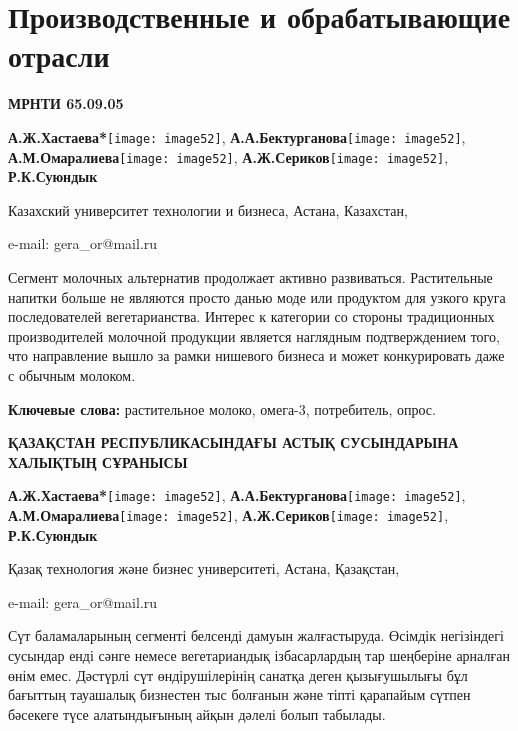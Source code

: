 \let\cleardoublepage\clearpage
\chapter{Производственные и обрабатывающие отрасли}

{\bfseries МРНТИ 65.09.05}


\begin{center}
{\bfseries А.Ж.Хастаева*}\texttt{[image: image52]},
{\bfseries А.А.Бектурганова}\texttt{[image: image52]},
{\bfseries А.М.Омаралиева}\texttt{[image: image52]},
{\bfseries А.Ж.Сериков}\texttt{[image: image52]},
{\bfseries Р.К.Суюндык}

Казахский университет технологии и бизнеса, Астана, Казахстан,

e-mail: gera\_or@mail.ru
\end{center}

Сегмент молочных альтернатив продолжает активно развиваться.
Растительные напитки больше не являются просто данью моде или продуктом
для узкого круга последователей вегетарианства. Интерес к категории со
стороны традиционных производителей молочной продукции является
наглядным подтверждением того, что направление вышло за рамки нишевого
бизнеса и может конкурировать даже с обычным молоком.

{\bfseries Ключевые слова:} растительное молоко, омега-3, потребитель,
опрос.

\begin{center}
{\large\bfseries ҚАЗАҚСТАН РЕСПУБЛИКАСЫНДАҒЫ АСТЫҚ СУСЫНДАРЫНА ХАЛЫҚТЫҢ СҰРАНЫСЫ}

\vspace{1em}
{\bfseries А.Ж.Хастаева*}\texttt{[image: image52]},
{\bfseries А.А.Бектурганова}\texttt{[image: image52]},
{\bfseries А.М.Омаралиева}\texttt{[image: image52]},
{\bfseries А.Ж.Сериков}\texttt{[image: image52]},
{\bfseries Р.К.Суюндык}

Қазақ технология және бизнес университеті, Астана, Қазақстан,

e-mail: gera\_or@mail.ru
\end{center}

Сүт баламаларының сегменті белсенді дамуын жалғастыруда. Өсімдік
негізіндегі сусындар енді сәнге немесе вегетариандық ізбасарлардың тар
шеңберіне арналған өнім емес. Дәстүрлі сүт өндірушілерінің санатқа деген
қызығушылығы бұл бағыттың тауашалық бизнестен тыс болғанын және тіпті
қарапайым сүтпен бәсекеге түсе алатындығының айқын дәлелі болып
табылады.

